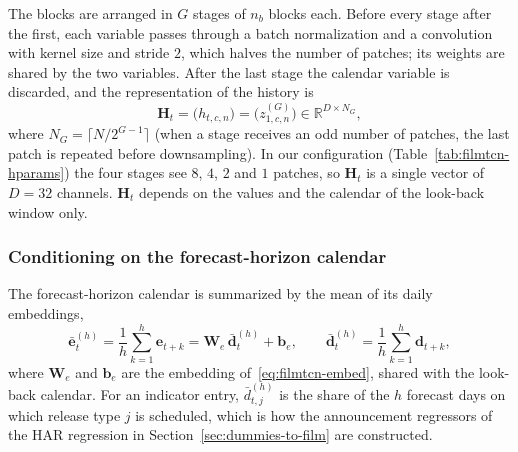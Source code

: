 The blocks are arranged in $G$ stages of $n_b$ blocks each. Before every stage
after the first, each variable passes through a batch normalization and a
convolution with kernel size and stride $2$, which halves the number of
patches; its weights are shared by the two variables. After the last stage the
calendar variable is discarded, and the representation of the history is
\begin{equation}
  \mathbf{H}_t = \bigl(h_{t,c,n}\bigr)
  = \bigl(z^{(G)}_{1,c,n}\bigr) \in \mathbb{R}^{D\times N_G},
  \label{eq:filmtcn-history}
\end{equation}
where $N_G = \lceil N/2^{G-1}\rceil$ (when a stage receives an odd number of
patches, the last patch is repeated before downsampling). In our configuration
(Table~\ref{tab:filmtcn-hparams}) the four stages see $8$, $4$, $2$ and $1$
patches, so $\mathbf{H}_t$ is a single vector of $D=32$ channels.
$\mathbf{H}_t$ depends on the values and the calendar of the look-back window
only.

\subsubsection{Conditioning on the forecast-horizon calendar}
\label{sec:filmtcn-film}

The forecast-horizon calendar is summarized by the mean of its daily
embeddings,
\begin{equation}
  \bar{\mathbf{e}}^{(h)}_t
  = \frac{1}{h}\sum_{k=1}^{h}\mathbf{e}_{t+k}
  = \mathbf{W}_e\,\bar{\mathbf{d}}^{(h)}_t + \mathbf{b}_e,
  \qquad
  \bar{\mathbf{d}}^{(h)}_t = \frac{1}{h}\sum_{k=1}^{h}\mathbf{d}_{t+k},
  \label{eq:filmtcn-cond}
\end{equation}
where $\mathbf{W}_e$ and $\mathbf{b}_e$ are the embedding
of~\eqref{eq:filmtcn-embed}, shared with the look-back calendar. For an
indicator entry, $\bar{d}^{(h)}_{t,j}$ is the share of the $h$ forecast days on
which release type $j$ is scheduled, which is how the announcement regressors
of the HAR regression in Section~\ref{sec:dummies-to-film} are constructed.

